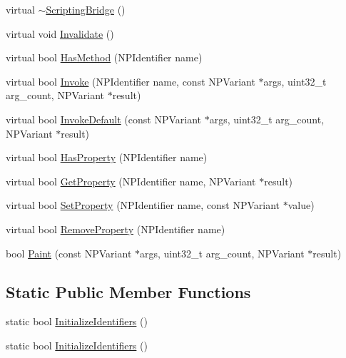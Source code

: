 \begin{DoxyCompactItemize}
\item 
virtual \hyperlink{classpi__generator_1_1_scripting_bridge_a59851d3f9406541b0805b87b874a1a49}{$\sim$ScriptingBridge} ()
\item 
virtual void \hyperlink{classpi__generator_1_1_scripting_bridge_a7b991ca4653d4a447d6a3f8760261780}{Invalidate} ()
\item 
virtual bool \hyperlink{classpi__generator_1_1_scripting_bridge_a5da4e0d7d9a2fe59b4838a40503a5a2e}{HasMethod} (NPIdentifier name)
\item 
virtual bool \hyperlink{classpi__generator_1_1_scripting_bridge_aed0d146930d7db6a548993629bb775f6}{Invoke} (NPIdentifier name, const NPVariant $\ast$args, uint32\_\-t arg\_\-count, NPVariant $\ast$result)
\item 
virtual bool \hyperlink{classpi__generator_1_1_scripting_bridge_abe1c6a84817b0a53c83527cbdc118dba}{InvokeDefault} (const NPVariant $\ast$args, uint32\_\-t arg\_\-count, NPVariant $\ast$result)
\item 
virtual bool \hyperlink{classpi__generator_1_1_scripting_bridge_adbcb9a1bd7516d027a55aabd1ab60cf1}{HasProperty} (NPIdentifier name)
\item 
virtual bool \hyperlink{classpi__generator_1_1_scripting_bridge_a6c4717a5a7d7c24c697d129904d0e0bf}{GetProperty} (NPIdentifier name, NPVariant $\ast$result)
\item 
virtual bool \hyperlink{classpi__generator_1_1_scripting_bridge_a81c45706acaa62a4ba74cc2f0d0150c4}{SetProperty} (NPIdentifier name, const NPVariant $\ast$value)
\item 
virtual bool \hyperlink{classpi__generator_1_1_scripting_bridge_a5f317f9adabc7082079a919d1163cc09}{RemoveProperty} (NPIdentifier name)
\item 
bool \hyperlink{classpi__generator_1_1_scripting_bridge_afcd2c9c3e990cae2d713e8bb5d84048d}{Paint} (const NPVariant $\ast$args, uint32\_\-t arg\_\-count, NPVariant $\ast$result)
\end{DoxyCompactItemize}
\subsection*{Static Public Member Functions}
\begin{DoxyCompactItemize}
\item 
static bool \hyperlink{classpi__generator_1_1_scripting_bridge_a76184c7bc22d728d207e275b5f980d67}{InitializeIdentifiers} ()
\item 
static bool \hyperlink{classpi__generator_1_1_scripting_bridge_ab1274471c47d3f5d1a56f3a604e0efff}{InitializeIdentifiers} ()
\end{DoxyCompactItemize}
